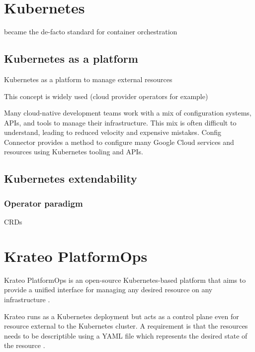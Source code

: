\section{Kubernetes}

became the de-facto standard for container orchestration

\subsection{Kubernetes as a platform}

Kubernetes as a platform to manage external resources

This concept is widely used 
(cloud provider operators for example)

Many cloud-native development teams work with a mix of configuration systems, APIs, and tools to manage their infrastructure. This mix is often difficult to understand, leading to reduced velocity and expensive mistakes. Config Connector provides a method to configure many Google Cloud services and resources using Kubernetes tooling and APIs.


\subsection{Kubernetes extendability}

\subsubsection{Operator paradigm}

CRDs

\section{Krateo PlatformOps}
\label{sec:krateo}

Krateo PlatformOps is an open-source Kubernetes-based platform that aims to provide a unified interface for managing any desired resource on any infrastructure \cite{krateo_docs}.

Krateo runs as a Kubernetes deployment but acts as a control plane even for resource external to the Kubernetes cluster.
A requirement is that the resources needs to be descriptible using a YAML file which represents the desired state of the resource \cite{krateo_docs}.


